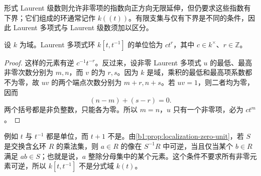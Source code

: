 \ProseParagraphBreak
形式 Laurent 级数则允许非零项的指数向正方向无限延伸，但仍要求这些指数有下界；它们组成的环通常记作 \(k(\!(t)\!)\)。有限支集与仅有下界是不同的条件，因此 Laurent 多项式与 Laurent 级数须加以区分。

\begin{proposition}\label{b1:prop:laurent-units}
	设 \(k\) 为域。Laurent 多项式环 \(k[t,t^{-1}]\) 的单位恰为 \(ct^r\)，其中 \(c\in k^\times\)、\(r\in\mathbb Z\)。
\end{proposition}
\begin{proof}
	这样的元素有逆 \(c^{-1}t^{-r}\)。反过来，设非零 Laurent 多项式 \(u\) 的最低、最高非零次数分别为 \(m,n\)，而 \(v\) 的为 \(r,s\)。因为 \(k\) 是域，乘积的最低和最高项系数都不为零，故 \(uv\) 的两个端点次数分别为 \(m+r,n+s\)。若 \(uv=1\)，则二者均为零，因而
	\[
		(n-m)+(s-r)=0.
	\]
	两个括号都是非负整数，只能各为零。所以 \(m=n\)，\(u\) 只有一个非零项，必为 \(ct^m\)。
\end{proof}
例如 \(t\) 与 \(t^{-1}\) 都是单位，而 \(t+1\) 不是。由\cref{b1:prop:localization-zero-unit}，若 \(S\) 是交换含幺环 \(R\) 的乘法集，则 \(a\in R\) 的像在 \(S^{-1}R\) 中可逆，当且仅当某个 \(b\in R\) 满足 \(ab\in S\)；也就是说，\(a\) 整除分母集中的某个元素。这个条件不要求所有非零元素可逆，所以 \(k[t,t^{-1}]\) 不是分式域 \(k(t)\)。
